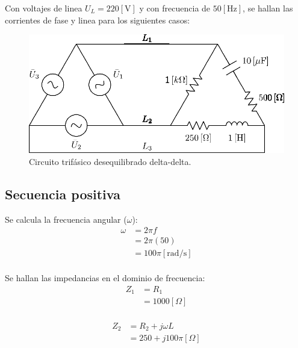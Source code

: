 \documentclass[letter,11pt]{article}
\begin{document}
Con voltajes de linea $U_L=220[\text{V}]$ y con frecuencia de $50[\text{Hz}]$,
se hallan las corrientes de fase y linea para los siguientes casos:

\begin{figure}[!h]
\centering
\includegraphics[scale=1.00]{figura1.eps}
\caption{Circuito trifásico desequilibrado delta-delta.}
\label{circuito1}
\end{figure}

\subsection{Secuencia positiva}
Se calcula la frecuencia angular ($\omega$):
\begin{equation*}
    \begin{split}
        \omega &= 2\pi f\\
               &= 2\pi(50)\\
               &= 100\pi[\text{rad}/\text{s}]\\
    \end{split}
\end{equation*}

Se hallan las impedancias en el dominio de frecuencia:
\begin{equation*}
    \begin{split}
        Z_1 &= R_1\\
            &= 1000[\Omega]\\
    \end{split}
\end{equation*}

\begin{equation*}
    \begin{split}
        Z_2 &= R_2+j\omega L\\
            &= 250+j100\pi[\Omega]\\
    \end{split}
\end{equation*}
\end{document}
